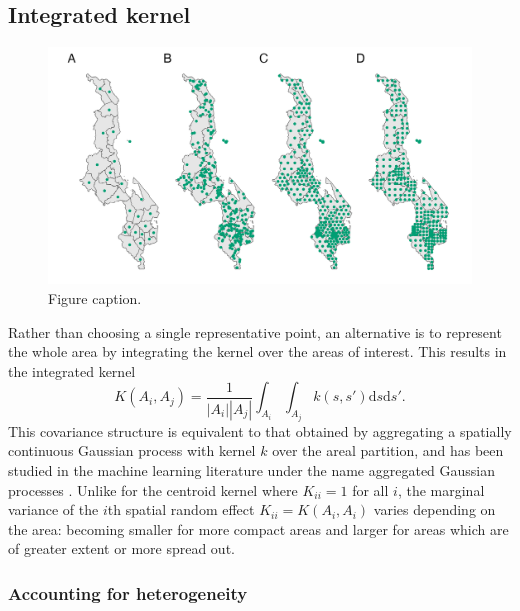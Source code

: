 \documentclass[a4paper, nobind]{templates/ociamthesis}
\begin{document}
\hypertarget{integrated-kernel}{%
\subsection{Integrated kernel}\label{integrated-kernel}}



\begin{figure}
\includegraphics[width=0.95\linewidth]{figures/beyond-borders/integration-strategy} \caption{Figure caption.}\label{fig:integration-strategy}
\end{figure}

Rather than choosing a single representative point, an alternative is to represent the whole area by integrating the kernel over the areas of interest.
This results in the integrated kernel
\begin{equation}
  K(A_i, A_j) = \frac{1}{|A_i||A_j|} \int_{A_i} \int_{A_j} k(s, s') \text{d} s \text{d} s'. \label{eq:ik1}
\end{equation}
This covariance structure is equivalent to that obtained by aggregating a spatially continuous Gaussian process with kernel \(k\) over the areal partition, and has been studied in the machine learning literature under the name aggregated Gaussian processes \autocite{law2018variational,tanaka2019spatially,yousefi2019multi,hamelijnck2019multi}.
Unlike for the centroid kernel where \(K_{ii} = 1\) for all \(i\), the marginal variance of the \(i\)th spatial random effect \(K_{ii} = K(A_i, A_i)\) varies depending on the area: becoming smaller for more compact areas and larger for areas which are of greater extent or more spread out.

\hypertarget{accounting-for-heterogeneity}{%
\subsubsection{Accounting for heterogeneity}\label{accounting-for-heterogeneity}}
\end{document}
